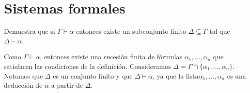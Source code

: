 \documentclass[fc]{tarea}
\begin{document}
\chapter{Sistemas formales}

\begin{exercise}
  Demuestra que si \(\Gamma\vdash\alpha\) entonces existe un subconjunto finito
  \(\Delta\subseteq\Gamma\) tal que \(\Delta\vdash\alpha\).
\end{exercise}
\begin{solution}
  Como \(\Gamma\vdash\alpha\), entonces existe una sucesión finita de fórmulas \(\alpha_1,\ldots,\alpha_n\) que satisfacen las condiciones de la 
  definición. Consideramos \(\Delta=\Gamma\cap\{\alpha_1,\ldots,\alpha_n\}\). Notamos que \(\Delta\) es un conjunto finito y que \(\Delta\vdash\alpha\), ya que
  la lista\(\alpha_1,\ldots,\alpha_n\) es una deducción de \(\alpha\) a partir de \(\Delta\).
\end{solution}
\end{document}
